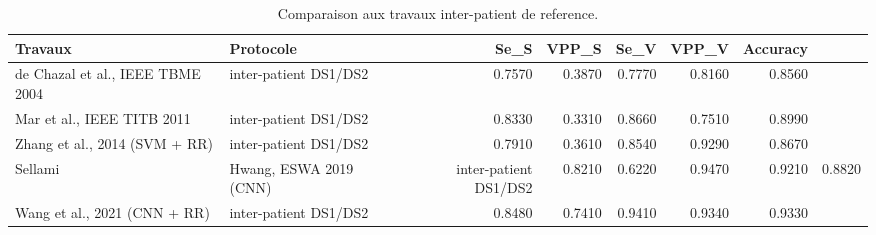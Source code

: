 \begin{table}
\caption{Comparaison aux travaux inter-patient de reference.}
\label{tab:sota}
\begin{tabular}{llrrrrr}
\toprule
Travaux & Protocole & Se_S & VPP_S & Se_V & VPP_V & Accuracy \\
\midrule
de Chazal et al., IEEE TBME 2004 & inter-patient DS1/DS2 & 0.7570 & 0.3870 & 0.7770 & 0.8160 & 0.8560 \\
Mar et al., IEEE TITB 2011 & inter-patient DS1/DS2 & 0.8330 & 0.3310 & 0.8660 & 0.7510 & 0.8990 \\
Zhang et al., 2014 (SVM + RR) & inter-patient DS1/DS2 & 0.7910 & 0.3610 & 0.8540 & 0.9290 & 0.8670 \\
Sellami & Hwang, ESWA 2019 (CNN) & inter-patient DS1/DS2 & 0.8210 & 0.6220 & 0.9470 & 0.9210 & 0.8820 \\
Wang et al., 2021 (CNN + RR) & inter-patient DS1/DS2 & 0.8480 & 0.7410 & 0.9410 & 0.9340 & 0.9330 \\
\bottomrule
\end{tabular}
\end{table}
